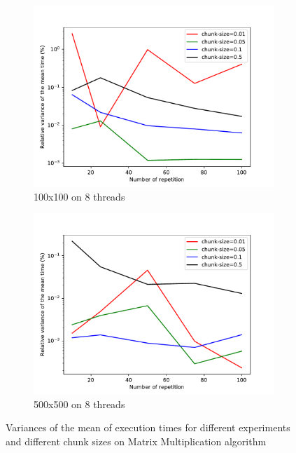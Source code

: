 \begin{figure}
\begin{subfigure}[b]{0.475\textwidth}
		\centering 
		\includegraphics[width=\textwidth]{images/relvar_100_8.pdf}
		\caption[]%
		{{\small 100x100 on 8 threads}}    
	\end{subfigure}
	\quad
	\begin{subfigure}[b]{0.475\textwidth}   
		\centering 
		\includegraphics[width=\textwidth]{images/relvar_500_8.pdf}
		\caption[]%
		{{\small 500x500 on 8 threads}}    
\end{subfigure}
	\caption[Standard deviations]
	{\small Variances of the mean of execution times for different experiments  and different chunk sizes on Matrix Multiplication algorithm} 

\end{figure}
\newpage
